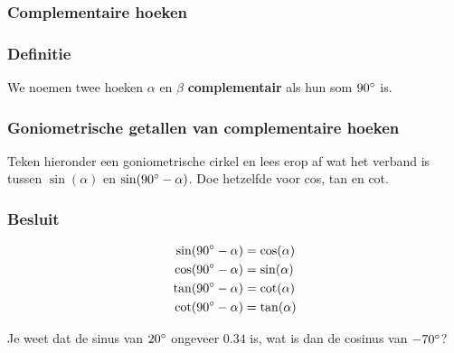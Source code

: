 \documentclass[a4paper,12pt]{article}
\begin{document}
\begin{theorie}

\pagebreak
\subsubsection{Complementaire hoeken}

\subsubsection*{Definitie}
We noemen twee hoeken $\alpha$ en $\beta$ \textbf{complementair} als hun som $90^\circ$ is.

\subsubsection*{Goniometrische getallen van complementaire hoeken}
Teken hieronder een goniometrische cirkel en lees erop af wat het verband is tussen $\sin(\alpha)$ en $\sin(90^\circ-\alpha)$. Doe hetzelfde voor cos, tan en cot.
\vspace*{7cm}

\subsubsection*{Besluit}
\begin{align*}
  \sin(90^\circ-\alpha)&=\cos(\alpha)\\
  \cos(90^\circ-\alpha)&=\sin(\alpha)\\
  \tan(90^\circ-\alpha)&=\cot(\alpha)\\
  \cot(90^\circ-\alpha)&=\tan(\alpha)
\end{align*}

\end{theorie}

\begin{oefening}
Je weet dat de sinus van $20^\circ$ ongeveer $0.34$ is, wat is dan de cosinus van $-70^\circ$?
\end{oefening}
\end{document}

